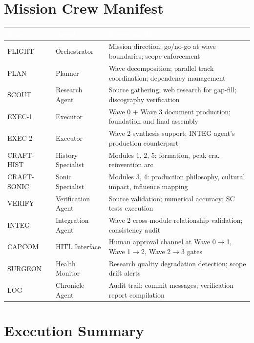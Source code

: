 \documentclass[11pt,letterpaper]{article}
\newcommand{\tableheader}[1]{\textbf{\sffamily\textcolor{white}{#1}}}
\begin{document}
\section{Mission Crew Manifest}

\begin{center}
\begin{tabularx}{\textwidth}{L{2cm}L{2.5cm}X}
\toprule
{}
\tableheader{Role} & \tableheader{Agent} & \tableheader{Responsibility} \\
\midrule
FLIGHT & Orchestrator & Mission direction; go/no-go at wave boundaries; scope enforcement \\
PLAN & Planner & Wave decomposition; parallel track coordination; dependency management \\
SCOUT & Research Agent & Source gathering; web research for gap-fill; discography verification \\
EXEC-1 & Executor & Wave 0 + Wave 3 document production; foundation and final assembly \\
EXEC-2 & Executor & Wave 2 synthesis support; INTEG agent's production counterpart \\
CRAFT-HIST & History Specialist & Modules 1, 2, 5: formation, peak era, reinvention arc \\
CRAFT-SONIC & Sonic Specialist & Modules 3, 4: production philosophy, cultural impact, influence mapping \\
VERIFY & Verification Agent & Source validation; numerical accuracy; SC tests execution \\
INTEG & Integration Agent & Wave 2 cross-module relationship validation; consistency audit \\
CAPCOM & HITL Interface & Human approval channel at Wave 0$\to$1, Wave 1$\to$2, Wave 2$\to$3 gates \\
SURGEON & Health Monitor & Research quality degradation detection; scope drift alerts \\
LOG & Chronicle Agent & Audit trail; commit messages; verification report compilation \\
\bottomrule
\end{tabularx}
\end{center}

\section{Execution Summary}
\end{document}
